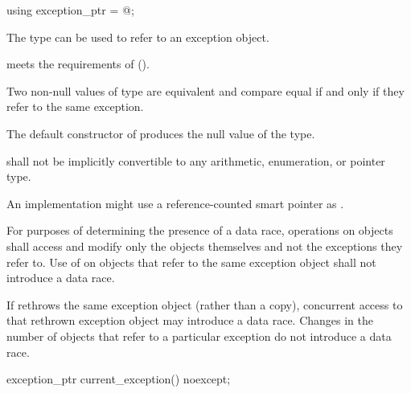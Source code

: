 %
\begin{itemdecl}
using exception_ptr = @\unspec@;
\end{itemdecl}

\begin{itemdescr}
\pnum
The type  can be used to refer to an exception object.

\pnum
{} meets the requirements of
 ().

\pnum
Two non-null values of type  are equivalent and compare equal if and
only if they refer to the same exception.

\pnum
The default constructor of  produces the null value of the
type.

\pnum
{} shall not be implicitly convertible to any arithmetic,
enumeration, or pointer type.

\pnum
\begin{note} An implementation might use a reference-counted smart
pointer as . \end{note}

\pnum
For purposes of determining the presence of a data race, operations on
 objects shall access and modify only the
 objects themselves and not the exceptions they refer to.
Use of  on  objects that refer to
the same exception object shall not introduce a data race. \begin{note} If
 rethrows the same exception object (rather than a copy),
concurrent access to that rethrown exception object may introduce a data race.
Changes in the number of  objects that refer to a
particular exception do not introduce a data race. \end{note}
\end{itemdescr}

%
\begin{itemdecl}
exception_ptr current_exception() noexcept;
\end{itemdecl}


